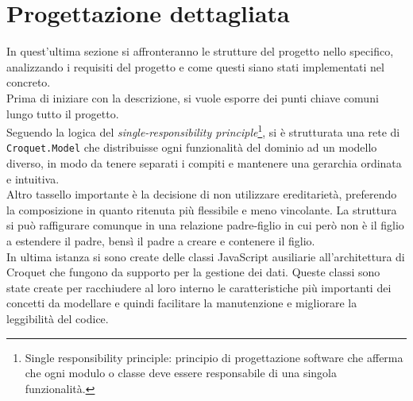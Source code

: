 \section{Progettazione dettagliata}\label{sec:progettazione}
In quest'ultima sezione si affronteranno le strutture del progetto nello specifico, analizzando i requisiti del progetto e come questi siano stati implementati nel concreto.\\
\newline
Prima di iniziare con la descrizione, si vuole esporre dei punti chiave comuni lungo tutto il progetto.\\
Seguendo la logica del \textit{single-responsibility principle}\footnote{Single responsibility principle: principio di progettazione software che afferma che ogni modulo o classe deve
essere responsabile di una singola funzionalità.}, si è strutturata una rete di \texttt{Croquet.Model} che distribuisse ogni funzionalità del dominio ad un modello diverso, in modo da 
tenere separati i compiti e mantenere una gerarchia ordinata e intuitiva.\\
Altro tassello importante è la decisione di non utilizzare ereditarietà, preferendo la composizione in quanto ritenuta più flessibile e meno vincolante. La struttura si può
raffigurare comunque in una relazione padre-figlio in cui però non è il figlio a estendere il padre, bensì il padre a creare e contenere il figlio.\\
In ultima istanza si sono create delle classi JavaScript ausiliarie all'architettura di Croquet che fungono da supporto per la gestione dei dati. Queste classi sono state create per 
racchiudere al loro interno le caratteristiche più importanti dei concetti da modellare e quindi facilitare la manutenzione e migliorare la leggibilità del codice.\\

